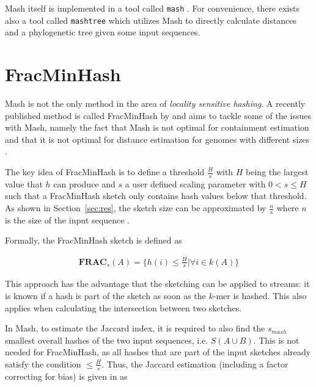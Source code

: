 Mash itself is implemented in a tool called \texttt{mash}
\cite{ondovMashFastGenome2016}. For convenience, there exists also a tool called
\texttt{mashtree} \cite{katzMashtreeRapidComparison2019} which utilizes Mash to
directly calculate distances and a phylogenetic tree given some input sequences.

\section{FracMinHash}
Mash is not the only method in the area of \textit{locality sensitive hashing}.
A recently published method is called FracMinHash by
\cite{irberLightweightCompositionalAnalysis2022} and aims to tackle some of the
issues with Mash, namely the fact that Mash is not optimal for containment
estimation and that it is not optimal for distance estimation for genomes with
different sizes
\cite{heraDerivingConfidenceIntervals2023,koslickiImprovingMinHashContainment2019}.

The key idea of FracMinHash is to define a threshold $\frac{H}{s}$ with $H$
being the largest value that $h$ can produce and $s$ a user defined scaling
parameter with $0 < s \leq H$ such that a FracMinHash sketch only contains hash
values below that threshold. As shown in Section~\ref{sec:res}, the sketch size can be
approximated by $\frac{n}{s}$ where $n$ is the size of the input sequence
\cite{irberLightweightCompositionalAnalysis2022,heraDerivingConfidenceIntervals2023}.


Formally, the FracMinHash sketch is defined as 

\begin{align}
  \mathbf{FRAC}_s(A) = \{h(i) \leq \frac{H}{s} | \forall i \in k(A)\}
\end{align}

This approach has the advantage that the sketching can be applied to streams: it
is known if a hash is part of the sketch as soon as the $k$-mer is hashed. This
also applies when calculating the intersection between two sketches. 

In Mash, to estimate the Jaccard index, it is required to also find the
$s_{mash}$ smallest overall hashes of the two input sequences, i.e. $S(A \cup
B)$. This is not needed for FracMinHash, as all hashes that are part of the
input sketches already satisfy the condition $\leq \frac{H}{s}$. Thus, the
Jaccard estimation (including a factor correcting for bias) is given in
\cite{heraDerivingConfidenceIntervals2023} as

